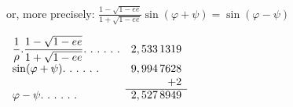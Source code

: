 \begin{minipage}[t]{.64\linewidth}\vspace{0pt}\centering
or, more precisely: \(\displaystyle\frac{1-\sqrt{1-ee}}{1+\sqrt{1-ee}}\sin(\varphi+\psi)=\sin(\varphi-\psi)\)
\par\medskip
\(\begin{array}{lr}
\displaystyle\frac1\rho.\frac{1-\sqrt{1-ee}}{1+\sqrt{1-ee}}\ldotp\,\ldotp\,\ldotp\,\ldotp\,\ldotp\,\ldotp&2,533\,1319\\[1.3ex]
\sin(\varphi+\psi)\ldotp\,\ldotp\,\ldotp\,\ldotp\,\ldotp\,\ldotp&9,994\,7628\\
&+2\\\cline{2-2}
\varphi-\psi\ldotp\,\ldotp\,\ldotp\,\ldotp\,\ldotp\,\ldotp&2,527\,8949
\end{array}\)
\end{minipage}
\par\endgroup

